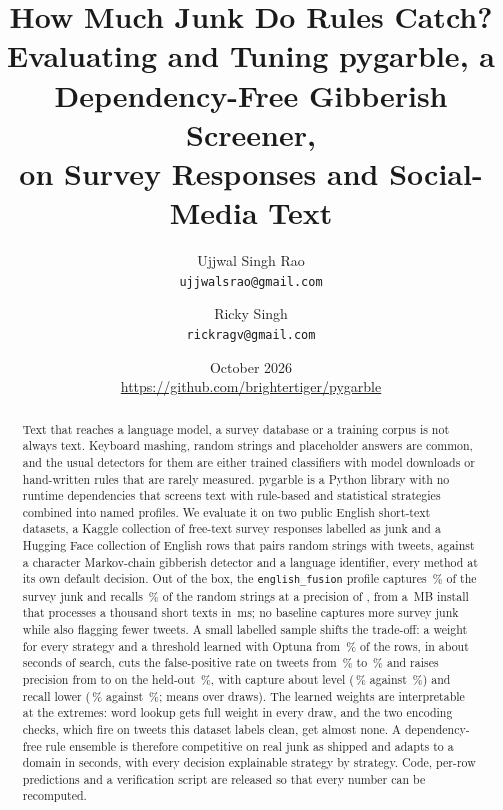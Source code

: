 \documentclass[10pt,twocolumn]{article}
\title{How Much Junk Do Rules Catch?\\
Evaluating and Tuning pygarble, a Dependency-Free Gibberish Screener,\\
on Survey Responses and Social-Media Text}
\author{Ujjwal Singh Rao\\
\texttt{ujjwalsrao@gmail.com}
\and
Ricky Singh\\
\texttt{rickragv@gmail.com}}
\date{October 2026\\[2pt]
\url{https://github.com/brightertiger/pygarble}}
\newcommand{\code}[1]{\texttt{#1}}
\begin{document}
\maketitle

\begin{abstract}
Text that reaches a language model, a survey database or a training corpus
is not always text. Keyboard mashing, random strings and placeholder
answers are common, and the usual detectors for them are either trained
classifiers with model downloads or hand-written rules that are rarely
measured. pygarble is a Python library with no runtime dependencies that
screens text with \nstrategies{} rule-based and statistical strategies
combined into named profiles. We evaluate it on two public English short-text datasets, a
Kaggle collection of \nA{} free-text survey responses labelled as junk and
a Hugging Face collection of \nB{} English rows that pairs \nBpos{} random
strings with \nBneg{} tweets, against a character Markov-chain gibberish
detector and a language identifier, every method at its own default
decision. Out of the box, the \code{english\_fusion} profile captures
\,\% of the survey junk and recalls
\,\% of the random strings at a precision
of , from a \,MB
install that processes a thousand short texts in \,ms;
no baseline captures more survey junk while also flagging fewer tweets.
A small labelled sample shifts the trade-off: a weight for every strategy
and a threshold learned with Optuna from \tuningpct\,\% of the rows, in
about \tuningseconds{} seconds of search, cuts the false-positive rate on
tweets from \,\% to
\,\% and raises precision from
 to  on the
held-out \heldoutpct\,\%, with capture about level
(\,\% against
\,\%) and recall lower
(\,\% against
\,\%; means over \tuningdraws{} draws).
The learned weights are interpretable at the extremes: word lookup gets
full weight in every draw, and the two encoding checks, which fire on
tweets this dataset labels clean, get almost none. A
dependency-free rule ensemble is therefore competitive on real junk as
shipped and adapts to a domain in seconds, with every decision
explainable strategy by strategy. Code, per-row predictions and a
verification script are released so that every number can be recomputed.
\end{abstract}
\end{document}
